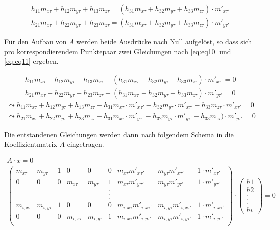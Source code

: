 
\begin{gather}
	h_{11}m_{x\tau}+h_{12}m_{y\tau}+h_{13}m_{z\tau}= (h_{31}m_{x\tau}+h_{32}m_{y\tau}+h_{33}m_{z\tau}) \cdot m'_{x\tau'}\\
	h_{21}m_{x\tau}+h_{22}m_{y\tau}+h_{23}m_{z\tau}= (h_{31}m_{x\tau}+h_{32}m_{y\tau}+h_{33}m_{z\tau}) \cdot m'_{y\tau'}
\end{gather}

Für den Aufbau von $A$ werden beide Ausdrücke nach Null aufgelöst, so dass sich pro korrespondierendem Punktepaar zwei Gleichungen nach \ref{eq:eq10} und \ref{eq:eq11} ergeben.

\begin{gather*}
	h_{11}m_{x\tau}+h_{12}m_{y\tau}+h_{13}m_{z\tau} -(h_{31}m_{x\tau}+h_{32}m_{y\tau}+h_{33}m_{z\tau}) \cdot m'_{x\tau'}= 0 \\	h_{21}m_{x\tau}+h_{22}m_{y\tau}+h_{23}m_{z\tau}-(h_{31}m_{x\tau}+h_{32}m_{y\tau}+h_{33}m_{z\tau}) \cdot m'_{y\tau'}=0
\end{gather*}
\begin{gather}
	\leadsto h_{11}m_{x\tau}+h_{12}m_{y\tau}+h_{13}m_{z\tau} -h_{31}m_{x\tau}\cdot m'_{x\tau'} - h_{32}m_{y\tau} \cdot m'_{x\tau'}-h_{33}m_{z\tau}\cdot m'_{x\tau'}= 0 \label{eq:eq10}\\
	\leadsto h_{21}m_{x\tau}+h_{22}m_{y\tau}+h_{23}m_{z\tau}-h_{31}m_{x\tau}\cdot m'_{y\tau'} -h_{32}m_{y\tau} \cdot m'_{y\tau'} -h_{33}m_{z\tau}) \cdot m'_{y\tau'}=0 \label{eq:eq11}
\end{gather}

Die entstandenen Gleichungen werden dann nach folgendem Schema in die Koeffizientmatrix $A$ eingetragen.\cite{Elements,HZ,Schwarz,Heipke}

\begin{gather}
		A\cdot x = 0\\
	\begin{pmatrix}
		m_{x\tau}&m_{y\tau}&1&0&0&0&m_{x\tau} m'_{x\tau'}&m_{y\tau} m'_{x\tau'} & 1\cdot m'_{x\tau'}\\
		0&0&0&m_{x\tau}&m_{y\tau}&1&m_{x\tau} m'_{y\tau'}&m_{y\tau} m'_{y\tau'} & 1\cdot m'_{y\tau'}\\
		&&&&&.&&&\\	
		&&&&&.&&&\\	
		&&&&&.&&&\\	
		m_{i,x\tau}&m_{i,y\tau}&1&0&0&0&m_{i,x\tau} m'_{i,x\tau'}&m_{i,y\tau} m'_{i,x\tau'} & 1\cdot m'_{i,x\tau'}\\
		0&0&0&m_{i,x\tau}&m_{i,y\tau}&1&m_{i,x\tau} m'_{i,y\tau'}&m_{i,y\tau} m'_{i,y\tau'} & 1\cdot m'_{i,y\tau'}\\
	\end{pmatrix}
	\cdot
	\begin{pmatrix}
		h1\\h2\\.\\.\\.\\hi
	\end{pmatrix}
	=0
\end{gather}

